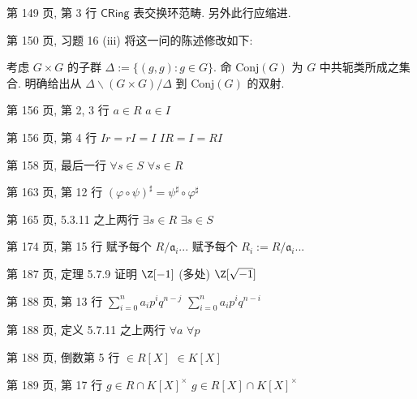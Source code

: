 \documentclass{AJerrata}
\begin{document}
\begin{Errata}
		\item[第 149 页, 第 3 行]
		$\mathsf{CRing}$ 表交换环范畴. 另外此行应缩进.
		
		\item[第 150 页, 习题 16 (iii)]
		将这一问的陈述修改如下:
		
		考虑 $G \times G$ 的子群 $\Delta := \{(g,g) : g \in G \}$. 命 $\text{Conj}(G)$ 为 $G$ 中共轭类所成之集合. 明确给出从 $\Delta \backslash (G \times G) /\Delta$ 到 $\text{Conj}(G)$ 的双射.
		
		
		\item[第 156 页, 第 2, 3 行]
		\Orig $a \in R$
		\Corr $a \in I$
		
		\item[第 156 页, 第 4 行]
		\Orig $Ir = rI = I$
		\Corr $IR = I = RI$

		\item[第 158 页, 最后一行]
		\Orig $\forall s \in S$
		\Corr $\forall s \in R$
		
		\item[第 163 页, 第 12 行]
		\Corr $(\varphi \circ \psi)^\sharp = \psi^\sharp \circ \varphi^\sharp$
		
		\item[第 165 页, 5.3.11 之上两行]
		\Orig $\exists s \in R$
		\Corr $\exists s \in S$
		
		\item[第 174 页, 第 15 行]
		\Orig 赋予每个 $R/\mathfrak{a}_i$...
		\Corr 赋予每个 $R_i := R/\mathfrak{a}_i$...

		\item[第 187 页, 定理 5.7.9 证明]
		\Orig $\Z[-1]$ (多处)
		\Corr $\Z[\sqrt{-1}]$

		\item[第 188 页, 第 13 行]
		\Orig $\sum_{i=0}^n a_i p^i q^{n-j}$
		\Corr $\sum_{i=0}^n a_i p^i q^{n-i}$
		
		\item[第 188 页, 定义 5.7.11 之上两行]
		\Orig $\forall a$
		\Corr $\forall p$

		\item[第 188 页, 倒数第 5 行]
		\Orig $\in R[X]$
		\Corr $\in K[X]$
		
		\item[第 189 页, 第 17 行]
		\Orig $g \in R \cap K[X]^\times$
		\Corr $g \in R[X] \cap K[X]^\times$
		

\end{Errata}
\end{document}
